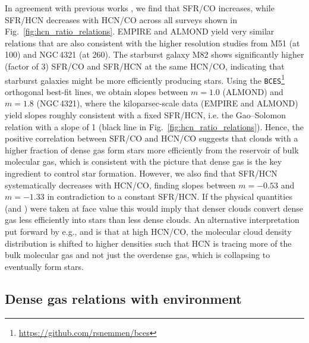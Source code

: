 \documentclass[letter, longauth]{aa} %
\begin{document}
In agreement with previous works \citep[e.g.][]{Jimenez-Donaire2019}, we find that SFR/CO increases, while SFR/HCN decreases with HCN/CO across all surveys shown in Fig.~\ref{fig:hcn_ratio_relations}.
EMPIRE and ALMOND yield very similar relations that are also consistent with the higher resolution studies from M51 (at \SI{100}{\parsec}) and NGC\,4321 (at \SI{260}{\parsec}).
The starburst galaxy M82 shows significantly higher (factor of 3) SFR/CO and SFR/HCN at the same HCN/CO, indicating that starburst galaxies might be more efficiently producing stars.
Using the \texttt{BCES}\footnote{
\url{https://github.com/rsnemmen/bces}} 
orthogonal best-fit lines, we obtain slopes between  $m=1.0$ (ALMOND) and  $m=1.8$ (NGC\,4321), where the kiloparsec-scale data (EMPIRE and ALMOND) yield slopes roughly consistent with a fixed SFR/HCN, i.e. the Gao--Solomon relation with a slope of 1 (black line in Fig.~\ref{fig:hcn_ratio_relations}).
Hence, the positive correlation between SFR/CO and HCN/CO suggests that clouds with a higher fraction of dense gas form stars more efficiently from the reservoir of bulk molecular gas, which is consistent with the picture that dense gas is the key ingredient to control star formation.
However, we also find that SFR/HCN systematically decreases with HCN/CO, finding slopes between $m=-0.53$ and  $m=-1.33$ in contradiction to a constant SFR/HCN.
If the physical quantities (\fdense and \sfedense) were taken at face value this would imply that denser clouds convert dense gas less efficiently into stars than less dense clouds.
An alternative interpretation put forward by e.g., \citet{Gallagher2018b} and \citet{Neumann2023a} is that at high HCN/CO, the molecular cloud density distribution is shifted to higher densities such that HCN is tracing more of the bulk molecular gas and not just the overdense gas, which is collapsing to eventually form stars.




\subsection{Dense gas relations with environment}
\label{sec:environment_relations}
\end{document}
